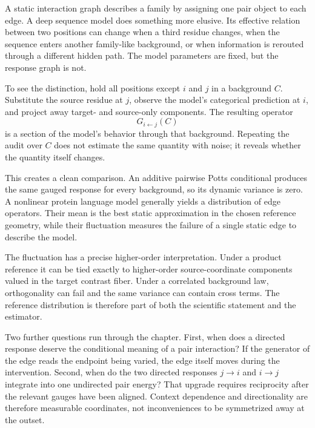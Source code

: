 A static interaction graph describes a family by assigning one pair object to each edge.  A deep
sequence model does something more elusive.  Its effective relation between two positions can
change when a third residue changes, when the sequence enters another family-like background, or
when information is rerouted through a different hidden path.  The model parameters are fixed,
but the response graph is not.

To see the distinction, hold all positions except $i$ and $j$ in a background $C$.  Substitute the
source residue at $j$, observe the model's categorical prediction at $i$, and project away target-
and source-only components.  The resulting operator
\begin{equation}
G_{i\leftarrow j}(C)
\end{equation}
is a section of the model's behavior through that background.  Repeating the audit over $C$ does
not estimate the same quantity with noise; it reveals whether the quantity itself changes.

This creates a clean comparison.  An additive pairwise Potts conditional produces the same gauged
response for every background, so its dynamic variance is zero.  A nonlinear protein language
model generally yields a distribution of edge operators.  Their mean is the best static
approximation in the chosen reference geometry, while their fluctuation measures the failure of a
single static edge to describe the model.

The fluctuation has a precise higher-order interpretation.  Under a product reference it can be
tied exactly to higher-order source-coordinate components valued in the target contrast fiber.  Under a correlated
background law, orthogonality can fail and the same variance can contain cross terms.  The
reference distribution is therefore part of both the scientific statement and the estimator.

Two further questions run through the chapter.  First, when does a directed response deserve the
conditional meaning of a pair interaction?  If the generator of the edge reads the endpoint being
varied, the edge itself moves during the intervention.  Second, when do the two directed responses
$j\to i$ and $i\to j$ integrate into one undirected pair energy?  That upgrade requires
reciprocity after the relevant gauges have been aligned.  Context dependence and directionality
are therefore measurable coordinates, not inconveniences to be symmetrized away at the outset.
